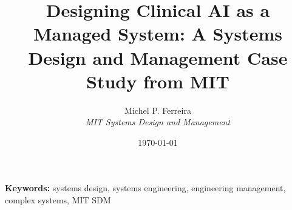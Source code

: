 \documentclass[11pt]{article}
\title{Designing Clinical AI as a Managed System: A Systems Design and Management Case Study from MIT}
\author{Michel P. Ferreira\\
\textit{MIT Systems Design and Management}}
\date{\today}
\providecommand{\keywords}[1]{\vspace{0.5em}\noindent\textbf{Keywords:} #1\par}
\begin{document}
\maketitle

\begin{abstract}

\end{abstract}

\keywords{systems design, systems engineering, engineering management, complex systems, MIT SDM}










\end{document}
